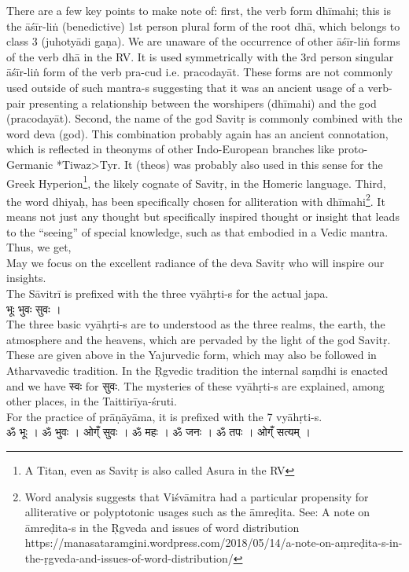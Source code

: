 \documentclass[12pt]{article}
\begin{document}
There are a few key points to make note of: first, the verb form dhīmahi; this is the āśīr-liṅ (benedictive) 1st person plural form of the root dhā, which belongs to class 3 (juhotyādi gaṇa). We are unaware of the occurrence of other āśīr-liṅ forms of the verb dhā in the RV. It is used symmetrically with the 3rd person singular āśīr-liṅ form of the verb pra-cud i.e. pracodayāt. These forms are not commonly used outside of such mantra-s suggesting that it was an ancient usage of a verb-pair presenting a relationship between the worshipers (dhīmahi) and the god (pracodayāt). Second, the name of the god Savitṛ is commonly combined with the word deva (god). This combination probably again has an ancient connotation, which is reflected in theonyms of other Indo-European branches like proto-Germanic *Tiwaz>Tyr. It (theos) was probably also used in this sense for the Greek Hyperion\footnote{A Titan, even as Savitṛ is also called Asura in the RV}, the likely cognate of Savitṛ, in the Homeric language. Third, the word dhiyaḥ, has been specifically chosen for alliteration with dhīmahi\footnote{Word analysis suggests that Viśvāmitra had a particular propensity for alliterative or polyptotonic usages such as the āmreḍita. See: A note on āmreḍita-s in the Ṛgveda and issues of word distribution https://manasataramgini.wordpress.com/2018/05/14/a-note-on-aṃreḍita-s-in-the-ṛgveda-and-issues-of-word-distribution/}. It means not just any thought but specifically inspired thought or insight that leads to the ``seeing'' of special knowledge, such as that embodied in a Vedic mantra. Thus, we get,\\[8pt]
May we focus on the excellent radiance of the deva Savitṛ who will inspire our insights.\\[10pt]
The Sāvitrī is prefixed with the three vyāhṛti-s for the actual japa. \\
{\skt भूः भुवः सुवः ।
}\\
The three basic vyāhṛti-s are to understood as the three realms, the earth, the atmosphere and the heavens, which are pervaded by the light of the god Savitṛ. These are given above in the Yajurvedic form, which may also be followed in Atharvavedic tradition. In the Ṛgvedic tradition the internal saṃdhi is enacted and we have {\skt स्वः } for {\skt सुवः}. The mysteries of these vyāhṛti-s are explained, among other places, in the Taittirīya-śruti. \\[10pt]
 For the practice of prāṇāyāma, it is prefixed with the 7 vyāhṛti-s.\\
{\skt ॐ भूः । ॐ भुवः । ओग्ँ सुवः । ॐ महः । ॐ जनः । ॐ तपः । ओग्ँ सत्यम् ।
}\\
\end{document}
